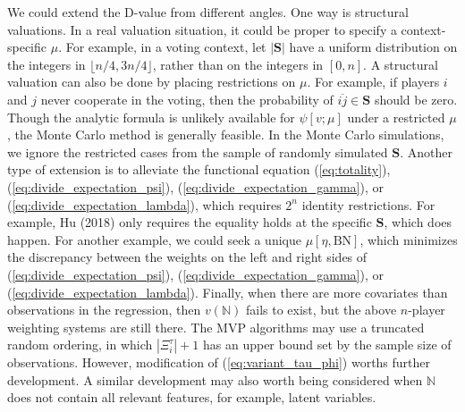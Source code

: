 \documentclass[a4paper,12pt]{article}
\begin{document}
We could extend the D-value from different angles. One way is structural valuations.
In a real valuation situation, it could be proper to specify a context-specific $\mu$.
For example, in a voting context, let $|\mathbf{S}|$ have a uniform distribution on the integers in $\lfloor n/4, 3n/4 \rfloor$, rather than on the integers in $[0,n]$.
A structural valuation can also be done by placing restrictions on $\mu$.
For example, if players $i$ and $j$  never cooperate in the voting, then the probability of  
$\overline{ij} \in \mathbf{S}$ should be zero.
Though the analytic formula is unlikely available for $\psi[v;\mu]$ under a restricted $\mu$, 
the Monte Carlo method is generally feasible.
In the Monte Carlo simulations, we ignore the restricted cases from the sample of
randomly simulated $\mathbf{S}$.
Another type of extension is to alleviate the functional equation (\ref{eq:totality}),  (\ref{eq:divide_expectation_psi}), (\ref{eq:divide_expectation_gamma}), or (\ref{eq:divide_expectation_lambda}),
which requires $2^n$ identity restrictions. 
For example, Hu (2018) only requires the equality holds at the specific $\mathbf{S}$, which does happen.
For another example, we could seek a unique $\mu [\eta, \mathrm{BN}]$, which minimizes the discrepancy between the weights on the left and right sides of (\ref{eq:divide_expectation_psi}),
(\ref{eq:divide_expectation_gamma}), or (\ref{eq:divide_expectation_lambda}).
Finally, when there are more covariates than observations in the regression, then $v(\mathbb{N})$ fails to exist, but the above $n$-player weighting systems are still there. 
The MVP algorithms may use a truncated random ordering,
in which $|\Xi_i^\tau|+1$ has an upper bound set by the sample size of observations.
However, modification of (\ref{eq:variant_tau_phi}) worths further development. 
A similar development may also worth being considered when $\mathbb{N}$ does not contain all relevant features, for example, latent variables.
\end{document}
